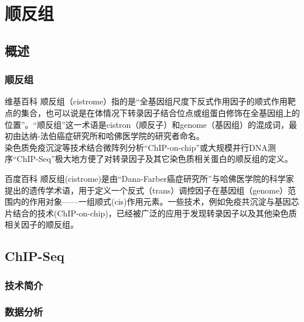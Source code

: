\section{顺反组}
\subsection{概述}
\begin{frame}[label=current]
  \frametitle{顺反组}
  \begin{block}{维基百科}
顺反组（cistrome）指的是“全基因组尺度下反式作用因子的顺式作用靶点的集合，也可以说是在体情况下转录因子结合位点或组蛋白修饰在全基因组上的位置”。“顺反组”这一术语是cistron（顺反子）和genome（基因组）的混成词，最初由达纳-法伯癌症研究所和哈佛医学院的研究者命名。\\
\vspace{0.3em}
    染色质免疫沉淀等技术结合微阵列分析“ChIP-on-chip”或大规模并行DNA测序“ChIP-Seq”极大地方便了对转录因子及其它染色质相关蛋白的顺反组的定义。
  \end{block}
  \pause
  \begin{block}{百度百科}
    顺反组(cistrome)是由“Dana-Farber癌症研究所”与哈佛医学院的科学家提出的遗传学术语，用于定义一个反式（trans）调控因子在基因组（genome）范围内的作用对象——一组顺式(cis)作用元素。一些技术，例如免疫共沉淀与基因芯片结合的技术(ChIP-on-chip)，已经被广泛的应用于发现转录因子以及其他染色质相关因子的顺反组。
  \end{block}
\end{frame}

\subsection{ChIP-Seq}
\subsubsection{技术简介}
\subsubsection{数据分析}

